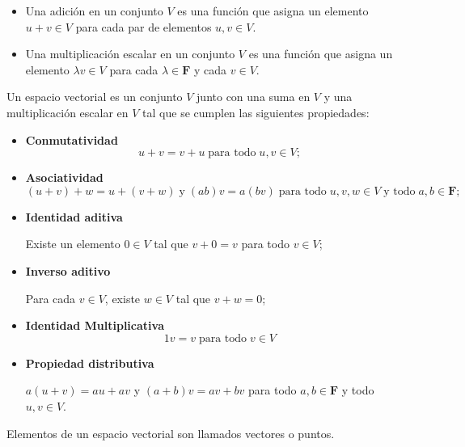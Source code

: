     \begin{mydef}\hfill
	\begin{itemize}
	    \item Una adición en un conjunto $V$ es una función que asigna un elemento $u+v\in V$ para cada par de elementos $u,v\in V$.
	    \item Una multiplicación escalar en un conjunto $V$ es una función que asigna un elemento $\lambda  v\in V$ para cada $\lambda \in \textbf{F}$ y cada $v\in V$.
	\end{itemize}
    \end{mydef}

    \begin{mydef} Un espacio vectorial es un conjunto $V$ junto con una suma en $V$ y una multiplicación escalar en $V$ tal que se cumplen las siguientes propiedades: 
	\begin{itemize}
	    \item \textbf{Conmutatividad}
		$$u+v=v+u\; \mbox{para todo}\; u,v\in V;$$
	    \item \textbf{Asociatividad}
		$$(u+v)+w=u+(v+w)\; \mbox{y}\; (ab)v=a(bv)\; \mbox{para todo}\; u,v,w \in V\; \mbox{y todo}\; a,b\in \textbf{F};$$
	    \item \textbf{Identidad aditiva}
		\begin{center}
		    Existe un elemento $0\in V$ tal que $v+0=v$ para todo $v\in V$;
		\end{center}

	    \item \textbf{Inverso aditivo}
		\begin{center}
		    Para cada $v\in V$, existe $w \in V$ tal que $v+w=0$;
		\end{center}

	    \item \textbf{Identidad Multiplicativa}
		$$1v=v\; \mbox{para todo}\; v\in V$$

	    \item \textbf{Propiedad distributiva}
		\begin{center}
		    $a(u+v)=au+av$ y $(a+b)v=av+bv$ para todo $a,b\in \textbf{F}$ y todo $u,v \in V$.
		\end{center}
	\end{itemize}
    \end{mydef}

    \begin{mydef}
	Elementos de un espacio vectorial son llamados vectores o puntos.
    \end{mydef}

